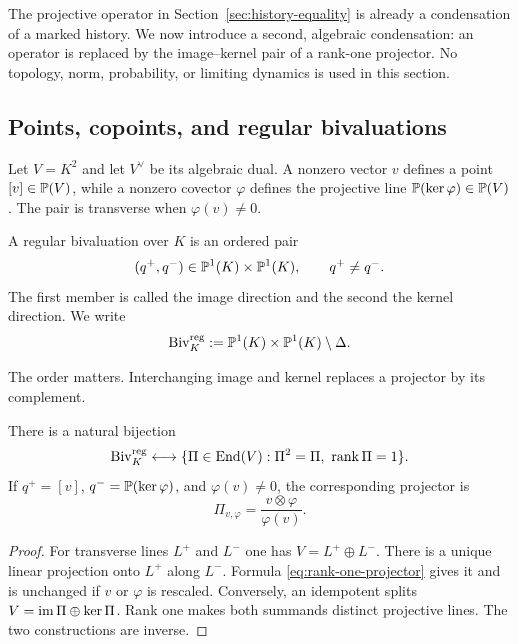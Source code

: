 The projective operator in Section~\ref{sec:history-equality} is already a
condensation of a marked history.  We now introduce a second, algebraic
condensation: an operator is replaced by the image--kernel pair of a rank-one
projector.  No topology, norm, probability, or limiting dynamics is used in
this section.

\subsection{Points, copoints, and regular bivaluations}

Let $V=K^2$ and let $V^\vee$ be its algebraic dual.  A nonzero vector $v$
defines a point $[v]\in\mathbb{P}(V)$, while a nonzero covector $\varphi$ defines the
projective line $\mathbb{P}(\ker\varphi)\in\mathbb{P}(V)$.  The pair is transverse when
$\varphi(v)\ne0$.

\begin{definition}
A regular bivaluation over $K$ is an ordered pair
\[
  (q^+,q^-)\in\mathbb{P}^1(K)\times\mathbb{P}^1(K),
  \qquad q^+\ne q^-.
\]
The first member is called the image direction and the second the kernel
direction.  We write
\[
  \operatorname{Biv}_K^{\mathrm{reg}}
  \mathrel{:=} \mathbb{P}^1(K)\times\mathbb{P}^1(K)\setminus\Delta.
\]
\end{definition}

The order matters.  Interchanging image and kernel replaces a projector by its
complement.

\begin{theorem}
\label{thm:bivaluation-projector}
There is a natural bijection
\[
  \operatorname{Biv}_K^{\mathrm{reg}}
  \longleftrightarrow
  \{\Pi\in\operatorname{End}(V):\Pi^2=\Pi,\ \operatorname{rank}\Pi=1\}.
\]
If $q^+=[v]$, $q^-=\mathbb{P}(\ker\varphi)$, and $\varphi(v)\ne0$, the
corresponding projector is
\begin{equation}
  \Pi_{v,\varphi}=\frac{v\otimes\varphi}{\varphi(v)}.
  \label{eq:rank-one-projector}
\end{equation}
\end{theorem}

\begin{proof}
For transverse lines $L^+$ and $L^-$ one has $V=L^+\oplus L^-$.  There is a
unique linear projection onto $L^+$ along $L^-$.  Formula
\eqref{eq:rank-one-projector} gives it and is unchanged if $v$ or $\varphi$
is rescaled.  Conversely, an idempotent splits
$V=\operatorname{im}\Pi\oplus\ker\Pi$.  Rank one makes both summands distinct projective
lines.  The two constructions are inverse.
\end{proof}

